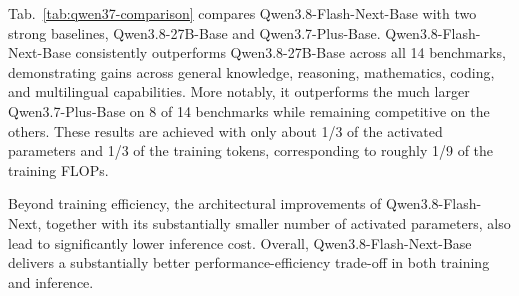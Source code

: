 Tab.~\ref{tab:qwen37-comparison} compares Qwen3.8-Flash-Next-Base with two strong baselines, Qwen3.8-27B-Base and Qwen3.7-Plus-Base. 
Qwen3.8-Flash-Next-Base consistently outperforms Qwen3.8-27B-Base across all 14 benchmarks, demonstrating gains across general knowledge, reasoning, mathematics, coding, and multilingual capabilities. 
More notably, it outperforms the much larger Qwen3.7-Plus-Base on 8 of 14 benchmarks while remaining competitive on the others. These results are achieved with only about 1/3 of the activated parameters and 1/3 of the training tokens, corresponding to roughly 1/9 of the training FLOPs. 

Beyond training efficiency, the architectural improvements of Qwen3.8-Flash-Next, together with its substantially smaller number of activated parameters, also lead to significantly lower inference cost. Overall, Qwen3.8-Flash-Next-Base delivers a substantially better performance-efficiency trade-off in both training and inference.
